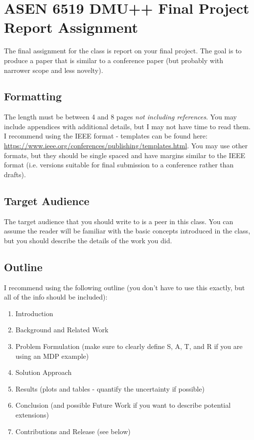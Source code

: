 \documentclass{article}
\begin{document}
\section*{ASEN 6519 DMU++ Final Project Report Assignment}

The final assignment for the class is report on your final project. The goal is to produce a paper that is similar to a conference paper (but probably with narrower scope and less novelty).

\subsection*{Formatting}

The length must be between 4 and 8 pages \emph{not including references}. You may include appendices with additional details, but I may not have time to read them. I recommend using the IEEE format - templates can be found here: \url{https://www.ieee.org/conferences/publishing/templates.html}. You may use other formats, but they should be single spaced and have margins similar to the IEEE format (i.e. versions suitable for final submission to a conference rather than drafts).

\subsection*{Target Audience}

The target audience that you should write to is a peer in this class. You can assume the reader will be familiar with the basic concepts introduced in the class, but you should describe the details of the work you did.

\subsection*{Outline}

I recommend using the following outline (you don't have to use this exactly, but all of the info should be included):

\begin{enumerate}[nosep]
    \item Introduction
    \item Background and Related Work
    \item Problem Formulation (make sure to clearly define S, A, T, and R if you are using an MDP example)
    \item Solution Approach
    \item Results (plots and tables - quantify the uncertainty if possible)
    \item Conclusion (and possible Future Work if you want to describe potential extensions)
    \item Contributions and Release (see below)
\end{enumerate}
\end{document}
